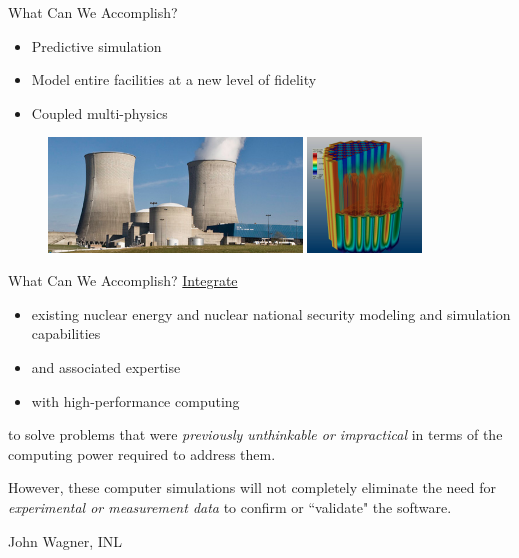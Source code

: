 \documentclass[xcolor=x11names,compress, handout]{beamer}
\renewcommand{\(}{\begin{columns}}
\renewcommand{\)}{\end{columns}}
\newcommand{\<}[1]{\begin{column}{#1}}
\renewcommand{\>}{\end{column}}
\begin{document}
\begin{frame}{What Can We Accomplish?}
\begin{itemize}
\item Predictive simulation 
\item Model entire facilities at a new level of fidelity
\item Coupled multi-physics
\end{itemize}
\begin{figure}
\includegraphics[height=1.2in,clip]{WattsBar}
\hfill
\includegraphics[height=1.2in,clip]{DenovoCore}
\end{figure}
\end{frame}


\begin{frame}{What Can We Accomplish?}
\underline{Integrate}
\begin{itemize}
\item existing nuclear energy and nuclear national security modeling and simulation capabilities
\item and associated expertise
\item with high-performance computing
\end{itemize}    
to solve problems that were \emph{previously unthinkable or impractical} in terms of the computing power required to address them.

\vspace*{1em}
However, these computer simulations will not completely eliminate the need for \emph{experimental or measurement data} to confirm or ``validate" the software. 

\vspace*{1em}
\hspace*{0.25 in} John Wagner, INL
\end{frame}
\end{document}
